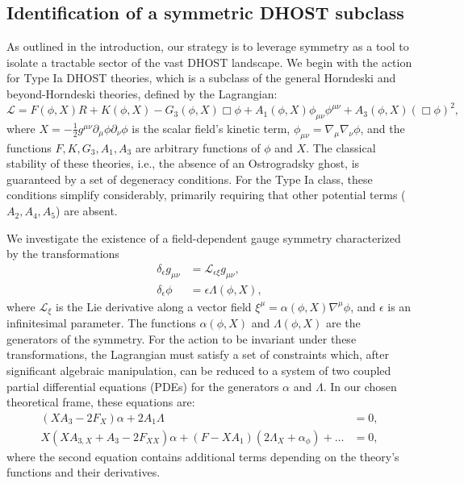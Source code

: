 \documentclass[twocolumn]{aastex631}
\begin{document}
\subsection{Identification of a symmetric DHOST subclass}
As outlined in the introduction, our strategy is to leverage symmetry as a tool to isolate a tractable sector of the vast DHOST landscape. We begin with the action for Type Ia DHOST theories, which is a subclass of the general Horndeski and beyond-Horndeski theories, defined by the Lagrangian:
\begin{equation}
    \mathcal{L} = F(\phi, X) R + K(\phi, X) - G_3(\phi, X) \Box\phi + A_1(\phi, X) \phi_{\mu\nu}\phi^{\mu\nu} + A_3(\phi, X) (\Box\phi)^2,
\end{equation}
where $X = - \frac{1}{2} g^{\mu\nu} \partial_\mu \phi \partial_\nu \phi$ is the scalar field's kinetic term, $\phi_{\mu\nu} = \nabla_\mu \nabla_\nu \phi$, and the functions $F, K, G_3, A_1, A_3$ are arbitrary functions of $\phi$ and $X$. The classical stability of these theories, i.e., the absence of an Ostrogradsky ghost, is guaranteed by a set of degeneracy conditions. For the Type Ia class, these conditions simplify considerably, primarily requiring that other potential terms ($A_2, A_4, A_5$) are absent.

We investigate the existence of a field-dependent gauge symmetry characterized by the transformations
\begin{align}
    \delta_\epsilon g_{\mu\nu} &= \mathcal{L}_{\epsilon \xi} g_{\mu\nu}, \\
    \delta_\epsilon \phi &= \epsilon \Lambda(\phi, X),
\end{align}
where $\mathcal{L}_{\xi}$ is the Lie derivative along a vector field $\xi^\mu = \alpha(\phi, X) \nabla^\mu \phi$, and $\epsilon$ is an infinitesimal parameter. The functions $\alpha(\phi, X)$ and $\Lambda(\phi, X)$ are the generators of the symmetry. For the action to be invariant under these transformations, the Lagrangian must satisfy a set of constraints which, after significant algebraic manipulation, can be reduced to a system of two coupled partial differential equations (PDEs) for the generators $\alpha$ and $\Lambda$. In our chosen theoretical frame, these equations are:
\begin{align}
    \left(X A_3 - 2 F_X\right) \alpha + 2 A_1 \Lambda &= 0, \label{eq:pde_one} \\
    X \left(X A_{3,X} + A_3 - 2 F_{XX}\right) \alpha + \left(F - X A_1 \right) \left(2 \Lambda_X + \alpha_\phi \right) + \dots &= 0, \label{eq:pde_two}
\end{align}
where the second equation contains additional terms depending on the theory's functions and their derivatives.
\end{document}
